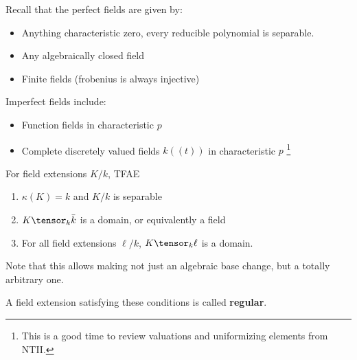 Recall that the perfect fields are given by:

\begin{itemize}
\tightlist
\item
  Anything characteristic zero, every reducible polynomial is separable.
\item
  Any algebraically closed field
\item
  Finite fields (frobenius is always injective)
\end{itemize}

Imperfect fields include:

\begin{itemize}
\tightlist
\item
  Function fields in characteristic \(p\)
\item
  Complete discretely valued fields \(k((t))\) in characteristic \(p\)
  \footnote{This is a good time to review valuations and uniformizing
    elements from NTII.}
\end{itemize}

\begin{theorem}

For field extensions \(K/k\), TFAE

\begin{enumerate}
\def\labelenumi{\arabic{enumi}.}
\item
  \(\kappa(K) = k\) and \(K/k\) is separable
\item
  \(K\tensor_k \bar k\) is a domain, or equivalently a field
\item
  For all field extensions \(\ell/k\), \(K\tensor_k \ell\) is a domain.
\end{enumerate}

\end{theorem}

\begin{remark}

Note that this allows making not just an algebraic base change, but a
totally arbitrary one.

\end{remark}

\begin{definition}[?]

A field extension satisfying these conditions is called
\textbf{regular}.

\end{definition}

